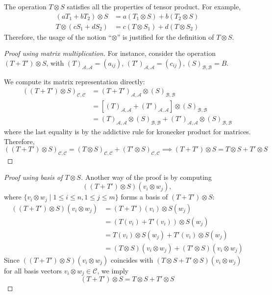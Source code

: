 \begin{proposition}
The operation $T\otimes S$ satisfies all the properties of tensor product.
For example,
\begin{align*}
(aT_1+bT_2)\otimes S &= a(T_1\otimes S)+b(T_2\otimes S)\\
T\otimes(cS_1+dS_2) &= c(T\otimes S_1)+d(T\otimes S_2)
\end{align*}
Therefore, the usage of the notion ``$\otimes$'' is justified for the definition of $T\otimes S$.
\end{proposition}
\begin{proof}[Proof using matrix multiplication]
For instance, consider the operation $(T+T')\otimes S$, with $(T)_{\mathcal{A},\mathcal{A}}=(a_{ij})$, $(T')_{\mathcal{A},\mathcal{A}}=(c_{ij}), (S)_{\mathcal{B},\mathcal{B}}=B$.

We compute its matrix representation directly:
\begin{align*}
((T+T')\otimes S)_{\mathcal{C},\mathcal{C}}
&=
(T+T')_{\mathcal{A},\mathcal{A}}\otimes (S)_{\mathcal{B},\mathcal{B}}\\
&=
[(T)_{\mathcal{A},\mathcal{A}}+(T')_{\mathcal{A},\mathcal{A}}]\otimes (S)_{\mathcal{B},\mathcal{B}}\\
&=
(T)_{\mathcal{A},\mathcal{A}}\otimes (S)_{\mathcal{B},\mathcal{B}}
+
(T')_{\mathcal{A},\mathcal{A}}\otimes (S)_{\mathcal{B},\mathcal{B}}
\end{align*}
where the last equality is by the addictive rule for kronecker product for matrices.
Therefore,
\[
((T+T')\otimes S)_{\mathcal{C},\mathcal{C}}=
(T\otimes S)_{\mathcal{C},\mathcal{C}} + 
(T'\otimes S)_{\mathcal{C},\mathcal{C}}
\implies
(T+T')\otimes S
=
T\otimes S+T'\otimes S
\]
\end{proof}
\begin{proof}[Proof using basis of $T\otimes S$]
Another way of the proof is by computing 
\[
((T+T')\otimes S)(v_i\otimes w_j),
\] 
where $\{v_i\otimes w_j\mid 1\le i\le n,1\le j\le m\}$ forms a basis of $(T+T')\otimes S$:
\begin{align*}
((T+T')\otimes S)(v_i\otimes w_j)
&=(T+T')(v_i)\otimes S(w_j)\\
&=(T(v_i)+T'(v_i))\otimes S(w_j)\\
&=T(v_i)\otimes S(w_j)+T'(v_i)\otimes S(w_j)\\
&=(T\otimes S)(v_i\otimes w_j)+(T'\otimes S)(v_i\otimes w_j)
\end{align*}
Since $((T+T')\otimes S)(v_i\otimes w_j)$ coincides with $(T\otimes S + T'\otimes S)(v_i\otimes w_j)$ for all basis vectors $v_i\otimes w_j\in\mathcal{C}$, we imply
\[
(T+T')\otimes S = T\otimes S+T'\otimes S
\]
\end{proof}


